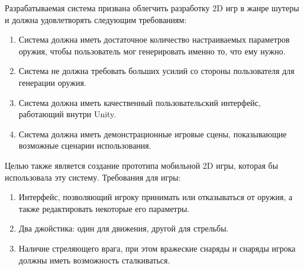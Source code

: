 Разрабатываемая система призвана облегчить разработку 2D игр в жанре шутеры и должна удовлетворять следующим требованиям:
\begin{enumerate}
    \item Система должна иметь достаточное количество настраиваемых параметров оружия, чтобы пользователь мог генерировать именно то, что ему нужно.
    \item Система не должна требовать больших усилий со стороны пользователя для генерации оружия.
    \item Система должна иметь качественный пользовательский интерфейс, работающий внутри Unity.
    \item Система должна иметь демонстрационные игровые сцены, показывающие возможные сценарии использования.
\end{enumerate}

\vspace{5mm}

Целью также является создание прототипа мобильной 2D игры, которая бы использовала эту систему. Требования для игры:
\begin{enumerate}
    \item Интерфейс, позволяющий игроку принимать или отказываться от оружия, а также редактировать некоторые его параметры.
    \item Два джойстика: один для движения, другой для стрельбы.
    \item Наличие стреляющего врага, при этом вражеские снаряды и снаряды игрока должны иметь возможность сталкиваться.
\end{enumerate}

\pagebreak





